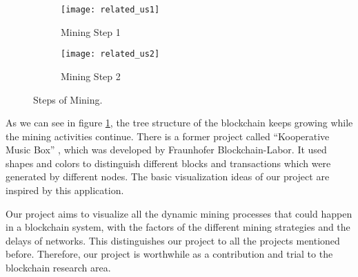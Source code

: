 \begin{figure}[htb]
    \centering
    \begin{subfigure}[b]{1\textwidth}
        \centering
        \texttt{[image: related\_us1]}
        \caption{Mining Step 1}
    \end{subfigure}

    \begin{subfigure}[b]{1\textwidth}
        \centering
        \texttt{[image: related\_us2]}
        \caption{Mining Step 2}
    \end{subfigure}

    \caption{Steps of Mining.}
    \label{fig:steps of mining}
\end{figure}

As we can see in figure \ref{fig:steps of mining}, the tree structure of the blockchain keeps growing while the mining activities continue. There is a former project called “Kooperative Music Box” \cite{musicbox}, which was developed by Fraunhofer Blockchain-Labor. It used shapes and colors to distinguish different blocks and transactions which were generated by different nodes. The basic visualization ideas of our project are inspired by this application.

Our project aims to visualize all the dynamic mining processes that could happen in a blockchain system, with the factors of the different mining strategies and the delays of networks. This distinguishes our project to all the projects mentioned before. Therefore, our project is worthwhile as a contribution and trial to the blockchain research area.
